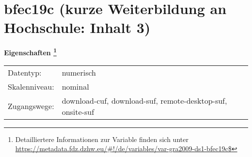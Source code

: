 
    \setcounter{footnote}{0}

    \vspace*{-1.8cm}
	\section{bfec19c (kurze Weiterbildung an Hochschule: Inhalt 3)}
	\label{section:bfec19c}



    \vspace*{0.5cm}
    \noindent\textbf{Eigenschaften
	\footnote{Detailliertere Informationen zur Variable finden sich unter
		\url{https://metadata.fdz.dzhw.eu/\#!/de/variables/var-gra2009-ds1-bfec19c$}}}\\
	\begin{tabularx}{\hsize}{@{}lX}
	Datentyp: & numerisch \\
	Skalenniveau: & nominal \\
	Zugangswege: &
	  download-cuf, 
	  download-suf, 
	  remote-desktop-suf, 
	  onsite-suf
 \\
    \end{tabularx}




